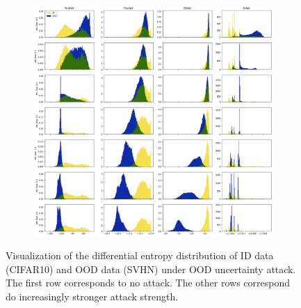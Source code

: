 \begin{figure}[ht!]
    \centering
        \begin{subfigure}[t]{1.0\textwidth}
        \centering
        \includegraphics[width=0.99 \textwidth]{sections/008_icml2021/eval/unc_dist_unc_ood_cifar10_c.png}
    \end{subfigure}%
    \caption{Visualization of the differential entropy distribution of ID data (CIFAR10) and OOD data (SVHN) under OOD uncertainty attack. The first row corresponds to no attack. The other rows correspond do increasingly stronger attack strength.}
    \label{fig:attaked_samples_idood_2}
	\vspace{-.5cm}
\end{figure}


